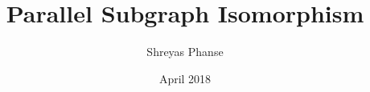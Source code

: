 \documentclass[MTech]{iitmdiss}
\def\thesistitle{Parallel Subgraph Isomorphism}
\def\thesisauthor{Shreyas Phanse}
\begin{document}


\title{\thesistitle}
\author{\thesisauthor}

\date{April 2018}

\begin{singlespace}
\maketitle 
\end{singlespace} 






\begin{singlespace}
\tableofcontents
\thispagestyle{empty}
\listoftables
{}
\listoffigures
{}
\end{singlespace}









%
\nocite{*}
\pagebreak
\begin{singlespace}
  \begin{small}
	
  \end{small}
\end{singlespace}

\end{document}
